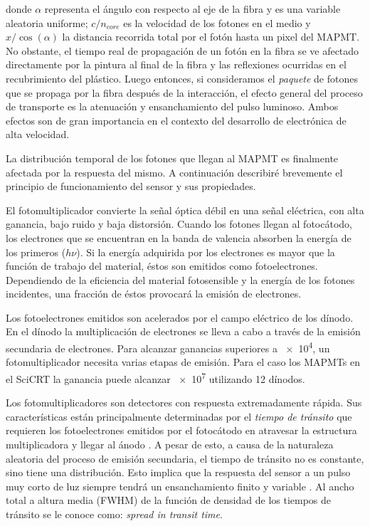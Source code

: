 donde $\alpha$ representa el ángulo con respecto al eje de la fibra y es una variable aleatoria uniforme; $c/n_{core}$ es la velocidad de los fotones en el medio y $x/\cos(\alpha)$ la distancia recorrida total por el fotón hasta un pixel del MAPMT. No obstante, el tiempo real de propagación de un fotón en la fibra se ve afectado directamente por la pintura al final de la fibra y las reflexiones ocurridas en el recubrimiento del plástico. Luego entonces, si consideramos el \emph{paquete} de fotones que se propaga por la fibra después de la interacción, el efecto general del proceso de transporte es la atenuación y ensanchamiento del pulso luminoso. Ambos efectos son de gran importancia en el contexto del desarrollo de electrónica de alta velocidad.

La distribución temporal de los fotones que llegan al MAPMT es finalmente afectada por la respuesta del mismo. A continuación describiré brevemente el principio de funcionamiento del sensor y sus propiedades.

El fotomultiplicador convierte la señal óptica débil en una señal eléctrica, con alta ganancia, bajo ruido y baja distorsión. Cuando los fotones llegan al fotocátodo, los electrones que se encuentran en la banda de valencia absorben la energía de los primeros ($h\nu$). Si la energía adquirida por los electrones es mayor que la función de trabajo del material, éstos son emitidos como fotoelectrones. Dependiendo de la eficiencia del material fotosensible y la energía de los fotones incidentes, una fracción de éstos provocará la emisión de electrones.

Los fotoelectrones emitidos son acelerados por el campo eléctrico de los dínodo. En el dínodo la multiplicación de electrones se lleva a cabo a través de la emisión secundaria de electrones. Para alcanzar ganancias superiores a \num{e4}, un fotomultiplicador necesita varias etapas de emisión. Para el caso los MAPMTs en el SciCRT la ganancia puede alcanzar \num{e7} utilizando \num{12} dínodos.

Los fotomultiplicadores son detectores con respuesta extremadamente rápida. Sus características están principalmente determinadas por el \emph{tiempo de tránsito} que requieren los fotoelectrones emitidos por el fotocátodo en atravesar la estructura multiplicadora y llegar al ánodo \cite{hama07}. A pesar de esto, a causa de la naturaleza aleatoria del proceso de emisión secundaria, el tiempo de tránsito no es constante, sino tiene una distribución. Esto implica que la respuesta del sensor a un pulso muy corto de luz siempre tendrá un ensanchamiento finito y variable \cite{syed07}. Al ancho total a altura media (FWHM) de la función de densidad de los tiempos de tránsito se le conoce como: \emph{spread in transit time}.

